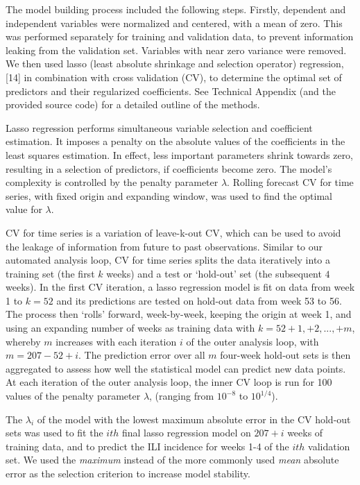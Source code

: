 \documentclass[]{article}
\begin{document}
The model building process included the following steps. Firstly,
dependent and independent variables were normalized and centered, with a
mean of zero. This was performed separately for training and validation
data, to prevent information leaking from the validation set. Variables
with near zero variance were removed. We then used lasso (least absolute
shrinkage and selection operator) regression,{[}14{]} in combination
with cross validation (CV), to determine the optimal set of predictors
and their regularized coefficients. See Technical Appendix (and the
provided source code) for a detailed outline of the methods.

Lasso regression performs simultaneous variable selection and
coefficient estimation. It imposes a penalty on the absolute values of
the coefficients in the least squares estimation. In effect, less
important parameters shrink towards zero, resulting in a selection of
predictors, if coefficients become zero. The model's complexity is
controlled by the penalty parameter \(\lambda\). Rolling forecast CV for
time series, with fixed origin and expanding window, was used to find
the optimal value for \(\lambda\).

CV for time series is a variation of leave-k-out CV, which can be used
to avoid the leakage of information from future to past observations.
Similar to our automated analysis loop, CV for time series splits the
data iteratively into a training set (the first \(k\) weeks) and a test
or `hold-out' set (the subsequent \(4\) weeks). In the first CV
iteration, a lasso regression model is fit on data from week 1 to
\(k = 52\) and its predictions are tested on hold-out data from week 53
to 56. The process then `rolls' forward, week-by-week, keeping the
origin at week 1, and using an expanding number of weeks as training
data with \(k = 52+1, +2,...,+m\), whereby \(m\) increases with each
iteration \(i\) of the outer analysis loop, with \(m = 207 - 52 + i\).
The prediction error over all \(m\) four-week hold-out sets is then
aggregated to assess how well the statistical model can predict new data
points. At each iteration of the outer analysis loop, the inner CV loop
is run for 100 values of the penalty parameter \(\lambda\), (ranging
from \(10^{-8}\) to \(10^{1/4}\)).

The \(\lambda_i\) of the model with the lowest maximum absolute error in
the CV hold-out sets was used to fit the \(ith\) final lasso regression
model on \(207 + i\) weeks of training data, and to predict the ILI
incidence for weeks 1-4 of the \(ith\) validation set. We used the
\emph{maximum} instead of the more commonly used \emph{mean} absolute
error as the selection criterion to increase model stability.
\end{document}
